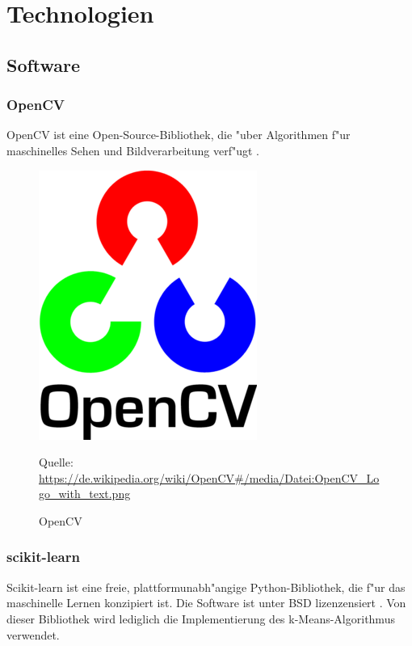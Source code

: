 \chapter{Technologien}
\label{cha:technologien}

\section{Software}
\label{sec:software}

\subsection{OpenCV}
\label{sec:opencv}

OpenCV ist eine Open-Source-Bibliothek, die "uber Algorithmen f"ur maschinelles Sehen und Bildverarbeitung verf"ugt \cite{Ocv}.

\begin{figure}[H]
	\includegraphics[scale=1.0]{bilder/opencv}
	\caption[OpenCV]{OpenCV}
	\small Quelle: \url{https://de.wikipedia.org/wiki/OpenCV#/media/Datei:OpenCV_Logo_with_text.png}
\end{figure}

\subsection{scikit-learn}
\label{sec:scikitlearn}

Scikit-learn ist eine freie, plattformunabh"angige Python-Bibliothek, die f"ur das maschinelle Lernen konzipiert ist. Die Software ist unter BSD lizenzensiert \cite{ScL}.
Von dieser Bibliothek wird lediglich die Implementierung des k-Means-Algorithmus verwendet.

